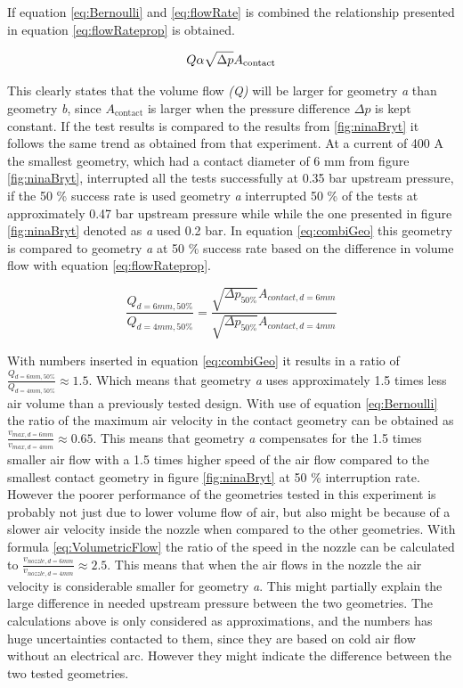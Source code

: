 \documentclass[10pt,a4paper,twoside]{article}
\begin{document}
If equation \eqref{eq:Bernoulli} and \eqref{eq:flowRate} is combined the relationship presented in equation \eqref{eq:flowRateprop} is obtained.

\begin{equation} \label{eq:flowRateprop}
Q \\ \alpha \\ \sqrt{\Delta p} A_\mathrm{{contact}}
\end{equation}

This clearly states that the volume flow \textit{(Q)} will be larger for geometry \textit{a} than geometry \textit{b}, since $A_\mathrm{{contact}}$ is larger when the pressure difference $\Delta p$ is kept constant. If the test results is compared to the results from \ref{fig:ninaBryt} it follows the same trend as obtained from that experiment. At a current of 400 A the smallest geometry, which had a contact diameter of 6 mm from figure \ref{fig:ninaBryt}, interrupted all the tests successfully at 0.35 bar upstream pressure, if the  50 \% success rate is used geometry \textit{a} interrupted 50 \% of the tests at approximately 0.47 bar upstream pressure while while the one presented in figure \ref{fig:ninaBryt} denoted as \textit{a} used 0.2 bar. In equation \eqref{eq:combiGeo} this geometry is  compared to geometry \textit{a} at 50 \% success rate based on the difference in volume flow with equation \eqref{eq:flowRateprop}.

\begin{equation} \label{eq:combiGeo}
\frac{Q_{d=6 mm, 50 \%}}{Q_{d=4 mm, 50 \%}}=\frac{\sqrt{\Delta p_{50 \%}} A_{contact, d=6 mm}}{\sqrt{\Delta p_{50 \%}} A_{contact, d=4 mm}}
\end{equation}

With numbers inserted in equation \eqref{eq:combiGeo} it results in a ratio of $\frac{Q_{d=6 mm, 50 \%}}{Q_{d=4 mm, 50 \%}}\approx 1.5$. Which means that geometry \textit{a} uses approximately 1.5 times less air volume than a previously tested design. With use of equation \eqref{eq:Bernoulli} the ratio of the maximum air velocity in the contact geometry can be obtained as $\frac{v_{max, d=6 mm}}{v_{max, d=4 mm}}\approx 0.65$. This means that geometry \textit{a} compensates for the 1.5 times smaller air flow with a 1.5 times higher speed of the air flow compared to the smallest contact geometry in figure \ref{fig:ninaBryt} at 50 \% interruption rate. However the poorer performance of the geometries tested in this experiment is probably not just due to lower volume flow of air, but also might be because of a slower air velocity inside the nozzle when compared to the other geometries. With formula \eqref{eq:VolumetricFlow} the ratio of the speed in the nozzle can be calculated to $\frac{v_{nozzle, d=6 mm}}{v_{nozzle, d=4 mm}}\approx 2.5$. This means that when the air flows in the nozzle the air velocity is considerable smaller for geometry \textit{a}. This might partially explain the large difference in needed upstream pressure between the two geometries. The calculations above is only considered as approximations, and the numbers has huge uncertainties contacted to them, since they are based on cold air flow without an electrical arc. However they might indicate the difference between the two tested geometries.
\end{document}
